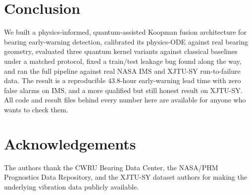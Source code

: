 \documentclass[3p,times,procedia]{elsarticle}
\begin{document}
\section{Conclusion}

We built a physics-informed, quantum-assisted Koopman fusion architecture for bearing early-warning detection, calibrated its physics-ODE against real bearing geometry, evaluated three quantum kernel variants against classical baselines under a matched protocol, fixed a train/test leakage bug found along the way, and ran the full pipeline against real NASA IMS and XJTU-SY run-to-failure data. The result is a reproducible 43.8-hour early-warning lead time with zero false alarms on IMS, and a more qualified but still honest result on XJTU-SY. All code and result files behind every number here are available for anyone who wants to check them.

\section*{Acknowledgements}

The authors thank the CWRU Bearing Data Center, the NASA/PHM Prognostics Data Repository, and the XJTU-SY dataset authors for making the underlying vibration data publicly available.
\end{document}
